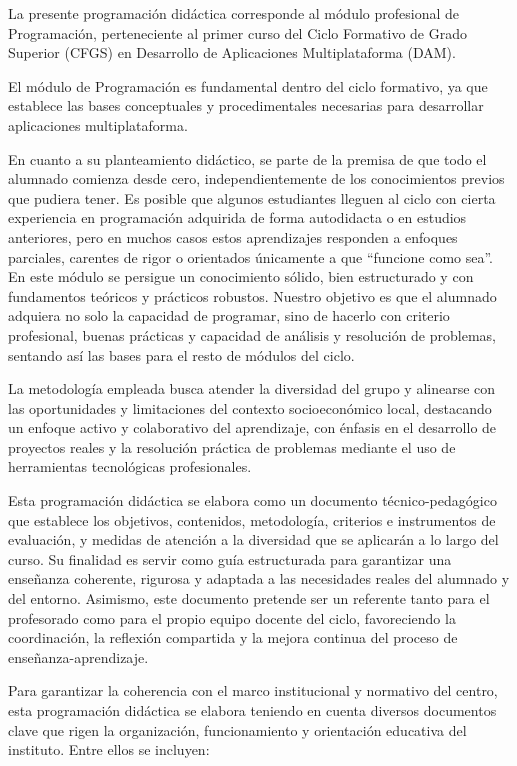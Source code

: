 
La presente programación didáctica corresponde al módulo profesional de Programación, perteneciente al primer curso del Ciclo Formativo de Grado Superior (CFGS) en Desarrollo de Aplicaciones Multiplataforma (DAM).

El módulo de Programación es fundamental dentro del ciclo formativo, ya que establece las bases conceptuales y procedimentales necesarias para desarrollar aplicaciones multiplataforma. 

En cuanto a su planteamiento didáctico, se parte de la premisa de que todo el alumnado comienza desde cero, independientemente de los conocimientos previos que pudiera tener. Es posible que algunos estudiantes lleguen al ciclo con cierta experiencia en programación adquirida de forma autodidacta o en estudios anteriores, pero en muchos casos estos aprendizajes responden a enfoques parciales, carentes de rigor o orientados únicamente a que “funcione como sea”. En este módulo se persigue un conocimiento sólido, bien estructurado y con fundamentos teóricos y prácticos robustos. Nuestro objetivo es que el alumnado adquiera no solo la capacidad de programar, sino de hacerlo con criterio profesional, buenas prácticas y capacidad de análisis y resolución de problemas, sentando así las bases para el resto de módulos del ciclo.

La metodología empleada busca atender la diversidad del grupo y alinearse con las oportunidades y limitaciones del contexto socioeconómico local, destacando un enfoque activo y colaborativo del aprendizaje, con énfasis en el desarrollo de proyectos reales y la resolución práctica de problemas mediante el uso de herramientas tecnológicas profesionales.

Esta programación didáctica se elabora como un documento técnico-pedagógico que establece los objetivos, contenidos, metodología, criterios e instrumentos de evaluación, y medidas de atención a la diversidad que se aplicarán a lo largo del curso. Su finalidad es servir como guía estructurada para garantizar una enseñanza coherente, rigurosa y adaptada a las necesidades reales del alumnado y del entorno. Asimismo, este documento pretende ser un referente tanto para el profesorado como para el propio equipo docente del ciclo, favoreciendo la coordinación, la reflexión compartida y la mejora continua del proceso de enseñanza-aprendizaje.

Para garantizar la coherencia con el marco institucional y normativo del centro, esta programación didáctica se elabora teniendo en cuenta diversos documentos clave que rigen la organización, funcionamiento y orientación educativa del instituto. Entre ellos se incluyen:

